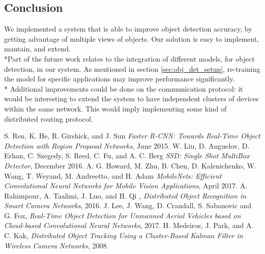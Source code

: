 \documentclass[10pt,conference,compsocconf]{IEEEtran}
\begin{document}
\begin{enumerate}
\section{Conclusion}
\label{sec:conclusion}
We implemented a system that is able to improve object detection accuracy, by getting advantage of multiple views of objects. Our solution is easy to implement, mantain, and extend.
\\*Part of the future work relates to the integration of different models, for object detection, in our system. As mentioned in section \ref{sec:obj_det_setup}, re-training the model for specific applications may improve performance significantly.\\*
Additional improvements could be done on the communication protocol: it would be interesting to extend the system to have independent clusters of devices within the same network. This would imply implementing some kind of distributed routing protocol.
\begin{thebibliography}{1}
\label{reference0}
S. Ren, K. He, R. Girshick, and J. Sun \emph{Faster R-CNN: Towards Real-Time Object
Detection with Region Proposal Networks}, June 2015.
\vspace*{-0.8\baselineskip}
\label{reference1}
W. Liu, D. Anguelov, D. Erhan, C. Szegedy, S. Reed, C. Fu, and A. C. Berg \emph{SSD: Single Shot MultiBox Detector}, December 2016.
\vspace*{-0.8\baselineskip}
\label{reference2}
A. G. Howard, M. Zhu, B. Chen, D. Kalenichenko, W. Wang, T. Weyand, M. Andreetto, and H. Adam \emph{MobileNets: Efficient Convolutional Neural Networks for Mobile Vision Applications}, April 2017.
\vspace*{-0.8\baselineskip}
\label{reference3}
A. Rahimpour, A. Taalimi, J. Luo, and H. Qi , \emph{Distributed Object Recognition in Smart Camera Networks}, 2016.
\vspace*{-0.8\baselineskip}
\label{reference6}
J. Lee, J. Wang, D. Crandall, S. Sabanovic and G. Fox, \emph{Real-Time Object Detection for Unmanned Aerial Vehicles based on Cloud-based Convolutional Neural Networks}, 2017.
\vspace*{-0.8\baselineskip}
\label{reference4}
H. Medeiros, J. Park, and A. C. Kak, \emph{Distributed Object Tracking Using a Cluster-Based Kalman Filter in Wireless Camera Networks}, 2008.

\end{thebibliography}
\end{enumerate}
\end{document}
